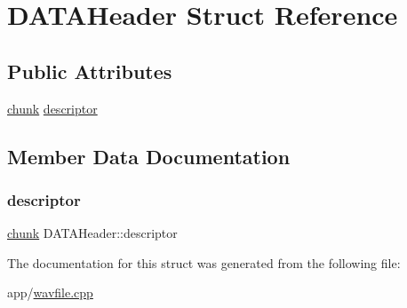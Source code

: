 \hypertarget{struct_d_a_t_a_header}{}\section{D\+A\+T\+A\+Header Struct Reference}
\label{struct_d_a_t_a_header}
\subsection*{Public Attributes}
\begin{DoxyCompactItemize}
\item 
\hyperlink{structchunk}{chunk} \hyperlink{struct_d_a_t_a_header_a27ddfe658a290eea9ef7bd6425f54585}{descriptor}
\end{DoxyCompactItemize}


\subsection{Member Data Documentation}
\hypertarget{struct_d_a_t_a_header_a27ddfe658a290eea9ef7bd6425f54585}{}\label{struct_d_a_t_a_header_a27ddfe658a290eea9ef7bd6425f54585} 
\subsubsection{\texorpdfstring{descriptor}{descriptor}}
{\footnotesize\ttfamily \hyperlink{structchunk}{chunk} D\+A\+T\+A\+Header\+::descriptor}



The documentation for this struct was generated from the following file\+:\begin{DoxyCompactItemize}
\item 
app/\hyperlink{wavfile_8cpp}{wavfile.\+cpp}\end{DoxyCompactItemize}
